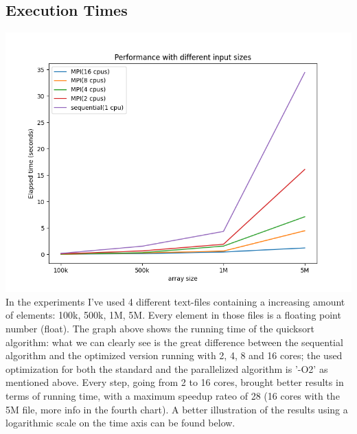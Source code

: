 \documentclass{article}
\begin{document}
\subsection*{Execution Times}
\includegraphics[scale=.6]{inputsChart.png}
In the experiments I've used 4 different text-files containing a increasing amount of elements: 
100k, 500k, 1M, 5M. Every element in those files is a floating point number (float). The graph 
above shows the running time of the quicksort algorithm: what we can clearly see is the great 
difference between the sequential algorithm and the optimized version running with 2, 4, 8 and 16 
cores; the used optimization for both the standard and the parallelized algorithm is '-O2' as 
mentioned above. Every step, going from 2 to 16 cores, brought better results in terms of running 
time, with a maximum speedup rateo of 28 (16 cores with the 5M file, more info in the fourth chart). 
A better illustration of the results using a logarithmic scale on the time axis can be found below.  
\end{document}
